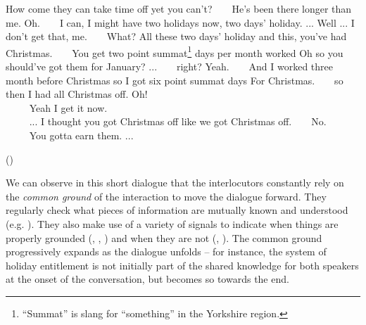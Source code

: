 \begin{dialogue} 
 How come they can take time off yet you can't?
 $\ \ \ \ \ \ $ He's been there longer than me.
 Oh.
  $\ \ \ \ \ \ $ I can, I might have two holidays now, two days' holiday. ...
 Well ... I don't get that, me.
  $\ \ \ \ \ \ $ What?
 All these two days' holiday and this, you've had Christmas.
  $\ \ \ \ \ \ $ You get two point summat\footnote{``Summat'' is slang for ``something'' in the Yorkshire region. } days per month worked
 Oh so you should've got them for January? ...
  $\ \ \ \ \ \ $ right?
 Yeah.
  $\ \ \ \ \ \ $ And I worked three month before Christmas so I got six point summat days
 For Christmas.
  $\ \ \ \ \ \ $ so then I had all Christmas off.
 Oh! \\
 $\phantom{a} \ \ \ \ \ \ \ $ Yeah I get it now. \\
 $\phantom{a} \ \ \ \ \ \ \ $ ... I thought you got Christmas off like we got Christmas off.
  $\ \ \ \ \ \ $ No. \\ 
 $\phantom{a} \ \ \ \ \ \ \ $ You gotta earn them. ... \vspace{-2mm}
 \begin{flushright}\begin{scriptsize}()\end{scriptsize}\end{flushright} 
\end{dialogue} 

We can observe in this short dialogue that the interlocutors constantly rely on the \textit{common ground} of the interaction to move the dialogue forward.  They regularly check what pieces of information are mutually known and understood (e.g. ).  They also make use of a variety of signals to indicate when things are properly grounded (, , ) and when they are not (, ). The common ground progressively expands as the dialogue unfolds -- for instance, the system of holiday entitlement is not initially part of the shared knowledge for both speakers at the onset of the conversation, but becomes so towards the end. 

